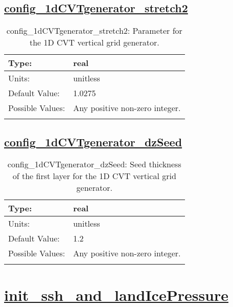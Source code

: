 \subsection[config\_1dCVTgenerator\_stretch2]{\hyperref[sec:nm_tab_CVTgenerator]{config\_1dCVTgenerator\_stretch2}}
\label{subsec:nm_sec_config_1dCVTgenerator_stretch2}
\begin{center}
\begin{longtable}{| p{2.0in} || p{4.0in} |}
    \hline
    Type: & real \\
    \hline
    Units: & \si{unitless} \\
    \hline
    Default Value: & 1.0275 \\
    \hline
    Possible Values: & Any positive non-zero integer. \\
    \hline
    \caption{config\_1dCVTgenerator\_stretch2: Parameter for the 1D CVT vertical grid generator.}
\end{longtable}
\end{center}
\subsection[config\_1dCVTgenerator\_dzSeed]{\hyperref[sec:nm_tab_CVTgenerator]{config\_1dCVTgenerator\_dzSeed}}
\label{subsec:nm_sec_config_1dCVTgenerator_dzSeed}
\begin{center}
\begin{longtable}{| p{2.0in} || p{4.0in} |}
    \hline
    Type: & real \\
    \hline
    Units: & \si{unitless} \\
    \hline
    Default Value: & 1.2 \\
    \hline
    Possible Values: & Any positive non-zero integer. \\
    \hline
    \caption{config\_1dCVTgenerator\_dzSeed: Seed thickness of the first layer for the 1D CVT vertical grid generator.}
\end{longtable}
\end{center}
\section[init\_ssh\_and\_landIcePressure]{\hyperref[sec:nm_tab_init_ssh_and_landIcePressure]{init\_ssh\_and\_landIcePressure}}
\label{sec:nm_sec_init_ssh_and_landIcePressure}
